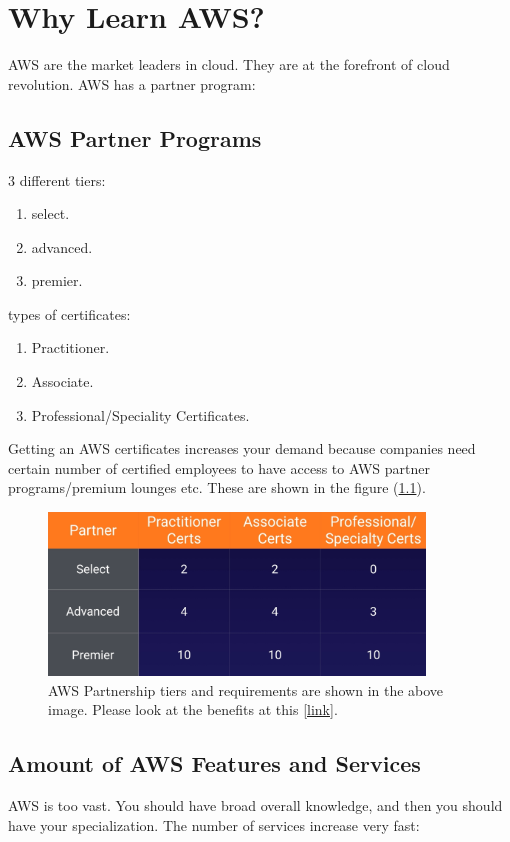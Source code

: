 \chapter{Why Learn AWS?}
AWS are the market leaders in cloud. They are at the forefront of cloud revolution.
AWS has a partner program:

\section{AWS Partner Programs}
3 different tiers:
\begin{enumerate}
	\item select.
	\item advanced.
	\item premier.
\end{enumerate}

types of certificates:
\begin{enumerate}
	\item Practitioner.
	\item Associate.
	\item Professional/Speciality Certificates.
\end{enumerate}

Getting an AWS certificates increases your demand because companies need certain number of certified employees to have access to AWS partner programs/premium lounges etc. These are shown in the figure (\ref{AWS-partner-tiers}).

\begin{figure}[htbp]
	\centering
	\includegraphics[width = 100mm]{./images/AWS-partner-tiers.png}
	\caption{AWS Partnership tiers and requirements are shown in the above image. Please look at the benefits at this \href{https://aws.amazon.com/blogs/apn/make-the-most-of-your-aws-partner-network-apn-benefits/}{[link]}.}
	\label{AWS-partner-tiers}
\end{figure}

\section{Amount of AWS Features and Services}
AWS is too vast. You should have broad overall knowledge, and then you should have your specialization. The number of services increase very fast:

